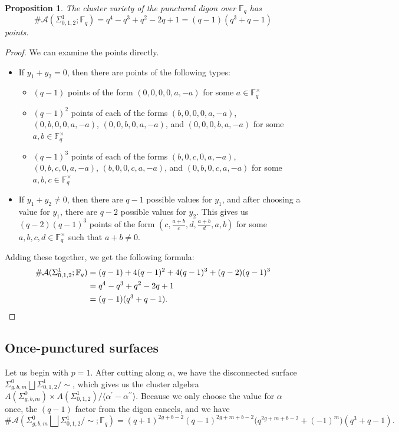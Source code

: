 \documentclass[reqno,12pt]{amsart}
\newtheorem{prop}[thm]{Proposition}
\theoremstyle{definition}
\theoremstyle{remark}
\theoremstyle{remark}
\numberwithin{equation}{section}
\begin{document}
\begin{prop}\label{prop: digon count}
    The cluster variety of the punctured digon over $\mathbb{F}_q$ has \[ \#\mathcal{A}(\Sigma_{0,1,2}^1; \mathbb{F}_q) = q^4 - q^3 + q^2 -2q +1 = (q-1)(q^3 + q - 1) \] points.
\end{prop}
\begin{proof}
    We can examine the points directly. 
    \begin{itemize}
        \item If $y_1 + y_2 = 0$, then there are points of the following types:
        \begin{itemize}
            \item $(q-1)$ points of the form $(0,0,0,0,a,-a)$ for some $a \in \mathbb{F}_q^\times$
            \item $(q-1)^2$ points of each of the forms $(b,0,0,0,a,-a)$, $(0,b,0,0,a,-a)$, $(0,0,b,0,a,-a)$, and $(0,0,0,b,a,-a)$ for some $a,b \in \mathbb{F}_q^\times$
            \item $(q-1)^3$ points of each of the forms $(b,0,c,0,a,-a)$, $(0,b,c,0,a,-a)$, $(b,0,0,c,a,-a)$, and $(0,b,0,c,a,-a)$ for some $a,b,c \in \mathbb{F}_q^\times$
        \end{itemize}
        \item If $y_1 + y_2 \neq 0$, then there are $q-1$ possible values for $y_1$, and after choosing a value for $y_1$, there are $q-2$ possible values for $y_2$. This gives us $(q-2)(q-1)^3$ points of the form $(c,\frac{a+b}{c}, d, \frac{a+b}{d}, a, b)$ for some $a,b,c,d \in \mathbb{F}_q^\times$ such that $a+b \neq 0$.
    \end{itemize}
    Adding these together, we get the following formula:
    \begin{align*}
        \#\mathcal{A}(\Sigma_{0,1,2}^1; \mathbb{F}_q) &= (q-1) + 4(q-1)^2 +4(q-1)^3 + (q-2)(q-1)^3\\
        &= q^4 - q^3 + q^2 -2q +1 \\
        &= (q-1)(q^3 +q - 1). \qedhere
    \end{align*}
\end{proof}

\subsection{Once-punctured surfaces}

Let us begin with $p=1$. After cutting along $\alpha$, we have the disconnected surface $\Sigma_{g,b,m}^{0} \bigsqcup \Sigma_{0,1,2}^1 /\!\sim$, which gives us the cluster algebra $A(\Sigma_{g,b,m}^{0}) \times A(\Sigma_{0,1,2}^1) / \langle \alpha^\prime - \alpha^{\prime \prime}\rangle$. Because we only choose the value for $\alpha$ once, the $(q-1)$ factor from the digon cancels, and we have 
\[ \#\mathcal{A}(\Sigma_{g,b,m}^{0} \bigsqcup \Sigma_{0,1,2}^1 /\!\sim; \mathbb{F}_q) = (q+1)^{2g+b-2} (q-1)^{2g+m+b-2} \big(q^{2g+m+b-2} + (-1)^{m}\big) (q^3 + q - 1). \] 
\end{document}
